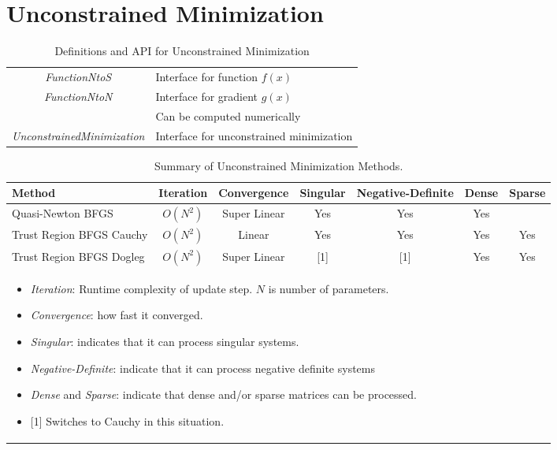 \documentclass[peerreview,compsoc,onecolumn]{IEEEtran}
\begin{document}
\section{Unconstrained Minimization}

\begin{table}[h]
\centering
\caption{\label{definitions:UM}Definitions and API for Unconstrained Minimization}
\begin{tabular}{cl}
\textit{FunctionNtoS} & Interface for function $f(x)$ \\
\textit{FunctionNtoN} & Interface for gradient $g(x)$ \\
& Can be computed numerically \\
\textit{UnconstrainedMinimization} & Interface for unconstrained minimization
\end{tabular}
\end{table}

\begin{table}[h]
\caption{\label{summary:UM}Summary of Unconstrained Minimization Methods.}
\centering
\begin{tabular}{lcccccc}
Method & Iteration & Convergence & Singular & Negative-Definite & Dense & Sparse \\[1ex]
\hline
Quasi-Newton BFGS        & $O(N^2)$ & Super Linear & Yes & Yes & Yes &  \rule{0pt}{2.6ex} \\
Trust Region BFGS Cauchy & $O(N^2)$ & Linear       & Yes & Yes & Yes & Yes  \\
Trust Region BFGS Dogleg & $O(N^2)$ & Super Linear & [1] & [1] & Yes & Yes  \\[1ex]
\hline
\multicolumn{6}{l}{
\begin{minipage}{0.6\textwidth}
\centering
\vspace{2mm}
\begin{itemize}[leftmargin=*]
\item \emph{Iteration}: Runtime complexity of update step. $N$ is number of parameters.
\item \emph{Convergence}: how fast it converged.
\item \emph{Singular}: indicates that it can process singular systems.
\item \emph{Negative-Definite}: indicate that it can process negative definite systems
\item \emph{Dense} and \emph{Sparse}: indicate that dense and/or sparse matrices can be processed. 
\item {[1]} Switches to Cauchy in this situation.
\end{itemize}
\end{minipage}
 }
\end{tabular}
\end{table}
\end{document}
